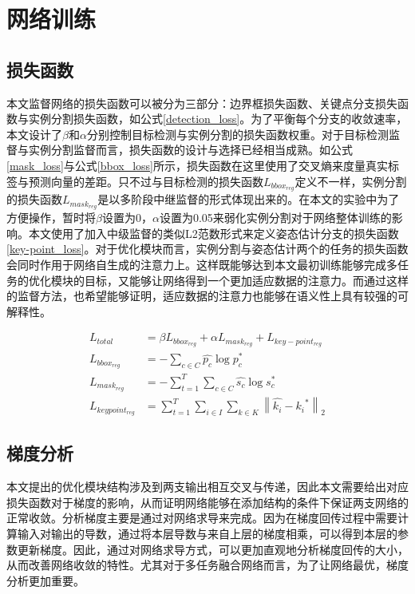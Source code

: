 \section{网络训练}
\label{sec:training}
\subsection{损失函数}
\label{subsec:lossfunction}

本文监督网络的损失函数可以被分为三部分：边界框损失函数、关键点分支损失函数与实例分割损失函数，如公式\eqref{detection_loss}。为了平衡每个分支的收敛速率，本文设计了$\beta$和$\alpha$分别控制目标检测与实例分割的损失函数权重。对于目标检测监督与实例分割监督而言，损失函数的设计与选择已经相当成熟。如公式\eqref{mask_loss}与公式\eqref{bbox_loss}所示，损失函数在这里使用了交叉熵来度量真实标签与预测向量的差距。只不过与目标检测的损失函数$L_{bbox_{reg}}$定义不一样，实例分割的损失函数$L_{mask_{reg}}$是以多阶段中继监督的形式体现出来的。在本文的实验中为了方便操作，暂时将$\beta$设置为0，$\alpha$设置为0.05来弱化实例分割对于网络整体训练的影响。本文使用了加入中级监督的类似L2范数形式来定义姿态估计分支的损失函数\eqref{key-point_loss}。对于优化模块而言，实例分割与姿态估计两个的任务的损失函数会同时作用于网络自生成的注意力上。这样既能够达到本文最初训练能够完成多任务的优化模块的目标，又能够让网络得到一个更加适应数据的注意力。而通过这样的监督方法，也希望能够证明，适应数据的注意力也能够在语义性上具有较强的可解释性。

\begin{align}
L_{total} &= \beta L_{bbox_{reg}} + \alpha L_{mask_{reg}} + L_{key-point_{reg}}\label{detection_loss}\\
L_{bbox_{reg}} &= -\sum_{c \in C}{\hat{p_c} \log{p_c^{*}}}\label{bbox_loss}\\
L_{mask_{reg}} &= -\sum_{t=1}^{T}\sum_{c \in C}{\hat{s_c} \log{s_c^{*}}}\label{mask_loss}\\
L_{keypoint_{reg}} &= \sum_{t=1}^{T}\sum_{i \in I}\sum_{k \in K}{\left\| \hat{k_i} - {k_i}^{*} \right\|_2}\label{key-point_loss}
\end{align}

\subsection{梯度分析}
\label{subsec:gradient}
本文提出的优化模块结构涉及到两支输出相互交叉与传递，因此本文需要给出对应损失函数对于梯度的影响，从而证明网络能够在添加结构的条件下保证两支网络的正常收敛。分析梯度主要是通过对网络求导来完成。因为在梯度回传过程中需要计算输入对输出的导数，通过将本层导数与来自上层的梯度相乘，可以得到本层的参数更新梯度。因此，通过对网络求导方式，可以更加直观地分析梯度回传的大小，从而改善网络收敛的特性。尤其对于多任务融合网络而言，为了让网络最优，梯度分析更加重要。

